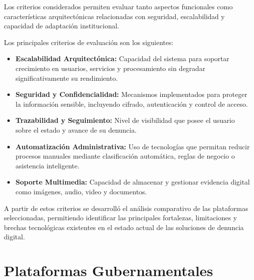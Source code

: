 \begin{flushleft}
\justifying

Los criterios considerados permiten evaluar tanto aspectos funcionales como características arquitectónicas relacionadas con seguridad, escalabilidad y capacidad de adaptación institucional.

Los principales criterios de evaluación son los siguientes:

\begin{itemize}
    
    \item \textbf{Escalabilidad Arquitectónica:} 
    Capacidad del sistema para soportar crecimiento en usuarios, servicios y procesamiento sin degradar significativamente su rendimiento.

    \item \textbf{Seguridad y Confidencialidad:}
    Mecanismos implementados para proteger la información sensible, incluyendo cifrado, autenticación y control de acceso.

    \item \textbf{Trazabilidad y Seguimiento:}
    Nivel de visibilidad que posee el usuario sobre el estado y avance de su denuncia.

    \item \textbf{Automatización Administrativa:}
    Uso de tecnologías que permitan reducir procesos manuales mediante clasificación automática, reglas de negocio o asistencia inteligente.

    \item \textbf{Soporte Multimedia:}
    Capacidad de almacenar y gestionar evidencia digital como imágenes, audio, video y documentos.

\end{itemize}

A partir de estos criterios se desarrolló el análisis comparativo de las plataformas seleccionadas, permitiendo identificar las principales fortalezas, limitaciones y brechas tecnológicas existentes en el estado actual de las soluciones de denuncia digital.

\end{flushleft}


\section{Plataformas Gubernamentales}

